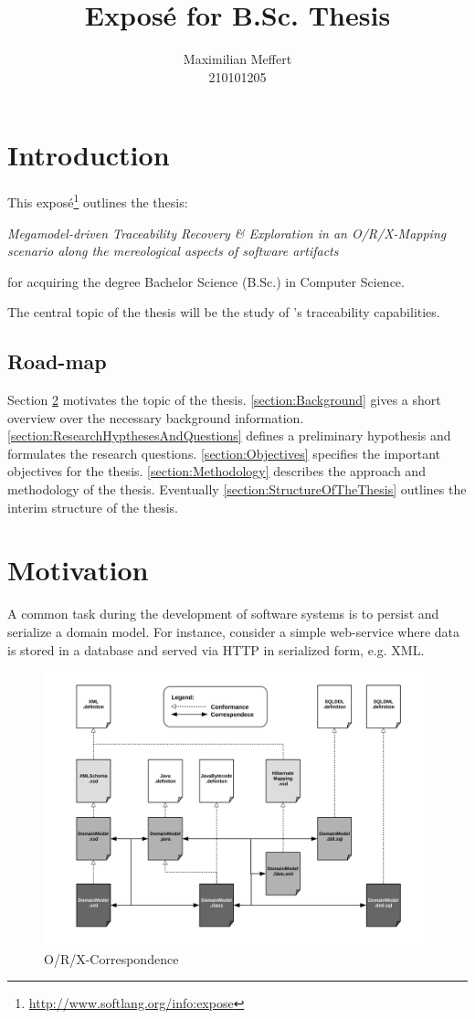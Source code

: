 \documentclass[runningheads,a4paper]{llncs}
\title{Exposé for B.Sc. Thesis}
\subtitle{\thesis}
\author{Maximilian Meffert\\210101205}
\institute{University of Koblenz-Landau}
\newcommand{\megal}{\text{MegaL}}
\newcommand{\thesis}{Megamodel-driven Traceability Recovery \& Exploration in an O/R/X-Mapping scenario along the mereological aspects of software artifacts}
\begin{document}
\maketitle
%


\section{Introduction}
This exposé\footnote{\url{http://www.softlang.org/info:expose}} outlines the thesis:
\begin{center}
\it
\thesis
\end{center}
for acquiring the degree Bachelor Science (B.Sc.) in Computer Science.

The central topic of the thesis will be the study of \megal's traceability capabilities.


\subsection{Road-map}
Section \ref{section:Motivation} motivates the topic of the thesis.
\ref{section:Background} gives a short overview over the necessary background information.
\ref{section:ResearchHypthesesAndQuestions} defines a preliminary hypothesis and formulates the research questions.
\ref{section:Objectives} specifies the important objectives for the thesis.
\ref{section:Methodology} describes the approach and methodology of the thesis.
Eventually \ref{section:StructureOfTheThesis} outlines the interim structure of the thesis.


\section{Motivation}
\label{section:Motivation}
A common task during the development of software systems is to persist and serialize a domain model.
For instance, consider a simple web-service where data is stored in a database and served via HTTP in serialized form, e.g. XML.

\begin{figure}[h!]
\centering
\includegraphics[width=.9\textwidth]{orx-correspondence-big-picture.png}
\caption{O/R/X-Correspondence}
\label{figure:ORXCorrespondenceBigPicture}
\end{figure}
\end{document}
